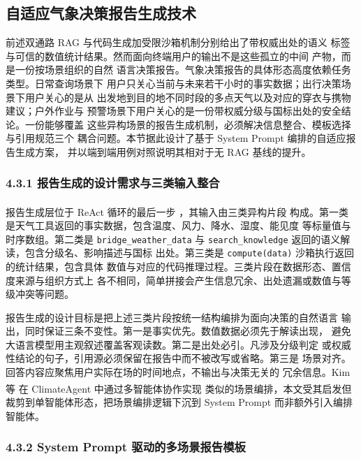 \documentclass[a4paper]{article}
\theoremstyle{definition}
\theoremstyle{plain}
\theoremstyle{remark}
\let\oldcite\cite
\renewcommand{\cite}[1]{\textsuperscript{\oldcite{#1}}}
\newcommand{\bk}{\discretionary{}{}{}}
\begin{document}
\subsection{自适应气象决策报告生成技术}
\label{sec:report-generation}

前述双通路 RAG 与代码生成加受限沙箱机制分别给出了带权威出处的语义
标签与可信的数值统计结果。然而面向终端用户的输出不是这些孤立的中间
产物，而是一份按场景组织的自然
语言决策报告。气象决策报告的具体形态高度依赖任务类型。日常查询场景下
用户只关心当前与未来若干小时的事实数据；出行决策场景下用户关心的是从
出发地到目的地不同时段的多点天气以及对应的穿衣与携物建议；户外作业与
预警场景下用户关心的是一份带权威分级与国标出处的安全结论。一份能够覆盖
这些异构场景的报告生成机制，必须解决信息整合、模板选择与引用规范三个
耦合问题。本节据此设计了基于 System Prompt 编排的自适应报告生成方案，
并以端到端用例对照说明其相对于无 RAG 基线的提升。

\subsubsection*{4.3.1 \quad 报告生成的设计需求与三类输入整合}

报告生成层位于 ReAct 循环的最后一步 \cite{ref18}，其输入由三类异构片段
构成。第一类是天气工具返回的事实数据，包含温度、风力、降水、湿度、能见度
等标量值与时序数组。第二类是 \texttt{bridge\_\bk{}weather\_\bk{}data} 与
\texttt{search\_\bk{}knowledge} 返回的语义解读，包含分级名、影响描述与国标
出处。第三类是 \texttt{compute(data)} 沙箱执行返回的统计结果，包含具体
数值与对应的代码推理过程。三类片段在数据形态、置信度来源与组织方式上
各不相同，简单拼接会产生信息冗余、出处遗漏或数值与等级冲突等问题。

报告生成的设计目标是把上述三类片段按统一结构编排为面向决策的自然语言
输出，同时保证三条不变性。第一是事实优先。数值数据必须先于解读出现，
避免大语言模型用主观叙述覆盖客观读数。第二是出处必引。凡涉及分级判定
或权威性结论的句子，引用源必须保留在报告中而不被改写或省略。第三是
场景对齐。回答内容应聚焦用户实际在场的时间地点，不输出与决策无关的
冗余信息。Kim 等 \cite{ref1} 在 ClimateAgent 中通过多智能体协作实现
类似的场景编排，本文受其启发但裁剪到单智能体形态，把场景编排逻辑下沉到
System Prompt 而非额外引入编排智能体。

\subsubsection*{4.3.2 \quad System Prompt 驱动的多场景报告模板}
\end{document}
